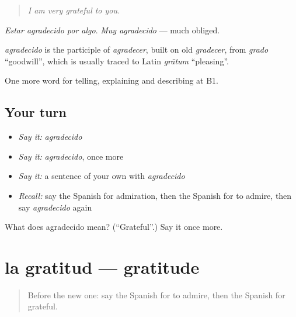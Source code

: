 \begin{quote}
\emph{I am very grateful to you.}
\end{quote}

\emph{Estar agradecido por algo}. \emph{Muy agradecido} — much obliged.

\begin{cousinweb}
\emph{agradecido} is the participle of \emph{agradecer}, built on old \emph{gradecer}, from \emph{grado} \textquotedblleft{}goodwill\textquotedblright{}, which is usually traced to Latin \emph{grātum} \textquotedblleft{}pleasing\textquotedblright{}.
\end{cousinweb}

\begin{grammarlens}[title={What you've built}]
One more word for telling, explaining and describing at B1.
\end{grammarlens}

\subsection*{Your turn}
\begin{itemize}
\raggedright
  \item \emph{Say it:} \emph{agradecido}
  \item \emph{Say it:} \emph{agradecido}, once more
  \item \emph{Say it:} a sentence of your own with \emph{agradecido}
  \item \emph{Recall:} say the Spanish for admiration, then the Spanish for to admire, then say \emph{agradecido} again
\end{itemize}

\begin{tcolorbox}[breakable,colback=teal!4,colframe=teal!35!black,title={Before you move on}]
What does agradecido mean? (\textquotedblleft{}Grateful\textquotedblright{}.) Say it once more.
\end{tcolorbox}
\section[la gratitud]{la gratitud — gratitude}

\label{lesson:ES-C720-gratitud}



\begin{quote}
Before the new one: say the Spanish for to admire, then the Spanish for grateful.
\end{quote}

